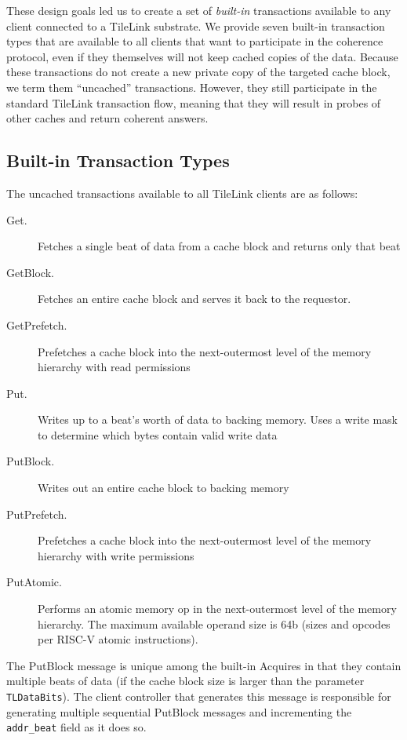 These design goals led us to create a set of {\em built-in} transactions available to any client connected to a TileLink substrate.
We provide seven built-in transaction types that are available to all clients that want to participate in the coherence protocol, even if they themselves will not keep cached copies of the data.
Because these transactions do not create a new private copy of the targeted cache block, we term them ``uncached'' transactions. 
However, they still participate in the standard TileLink transaction flow, meaning that they will result in probes of other caches and return coherent answers.

\subsection{Built-in Transaction Types}

The uncached transactions available to all TileLink clients are as follows:
\begin{description}
\item[Get.] Fetches a single beat of data from a cache block and returns only that beat
\item[GetBlock.] Fetches an entire cache block and serves it back to the requestor.
\item[GetPrefetch.]  Prefetches a cache block into the next-outermost level of the memory hierarchy with read permissions
\item[Put.] Writes up to a beat's worth of data to backing memory. Uses a write mask to determine which bytes contain valid write data
\item[PutBlock.] Writes out an entire cache block to backing memory
\item[PutPrefetch.]  Prefetches a cache block into the next-outermost level of the memory hierarchy with write permissions
\item[PutAtomic.] Performs an atomic memory op in the next-outermost level of the memory hierarchy. The maximum available operand size is 64b (sizes and opcodes per RISC-V atomic instructions).
\end{description}

The PutBlock message is unique among the built-in Acquires in that they contain multiple beats of data (if the cache block size is larger than the parameter {\tt TLDataBits}).
The client controller that generates this message is responsible for generating multiple sequential PutBlock messages and incrementing the {\tt addr\_beat} field as it does so.

